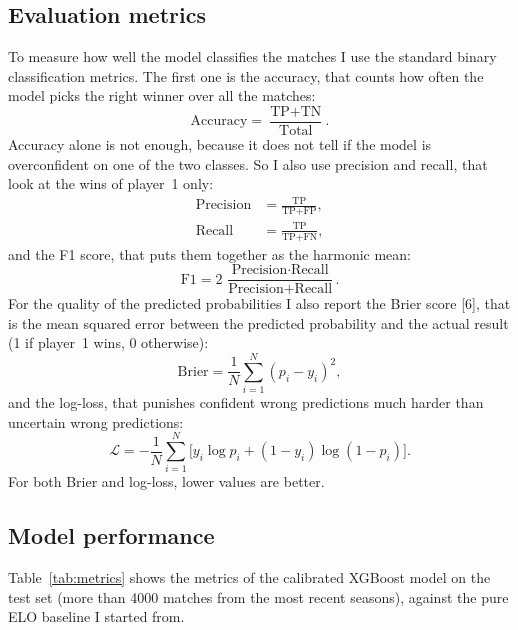 \documentclass[10pt,twocolumn]{article}
\begin{document}
\subsection{Evaluation metrics}
To measure how well the model classifies the matches I use the standard
binary classification metrics. The first one is the accuracy, that
counts how often the model picks the right winner over all the matches:
\begin{equation}
  \text{Accuracy} = \frac{\text{TP} + \text{TN}}{\text{Total}}.
\end{equation}
Accuracy alone is not enough, because it does not tell if the model is
overconfident on one of the two classes. So I also use precision and
recall, that look at the wins of player~1 only:
\begin{align}
  \text{Precision} &= \frac{\text{TP}}{\text{TP} + \text{FP}}, \\[2pt]
  \text{Recall}    &= \frac{\text{TP}}{\text{TP} + \text{FN}},
\end{align}
and the F1 score, that puts them together as the harmonic mean:
\begin{equation}
  \text{F1} = 2\,\frac{\text{Precision}\cdot\text{Recall}}
                     {\text{Precision} + \text{Recall}}.
\end{equation}
For the quality of the predicted probabilities I also report the Brier
score [6], that is the mean squared error between the predicted
probability and the actual result (1 if player~1 wins, 0 otherwise):
\begin{equation}
  \text{Brier} = \frac{1}{N}\sum_{i=1}^{N} (p_i - y_i)^2 ,
\end{equation}
and the log-loss, that punishes confident wrong predictions much harder
than uncertain wrong predictions:
\begin{equation}
  \mathcal{L} = -\frac{1}{N}\sum_{i=1}^{N}
       \big[y_i \log p_i + (1-y_i)\log(1-p_i)\big].
\end{equation}
For both Brier and log-loss, lower values are better.

\subsection{Model performance}
Table~\ref{tab:metrics} shows the metrics of the calibrated XGBoost model
on the test set (more than \num{4000} matches from the most recent
seasons), against the pure ELO baseline I started from.
\end{document}
